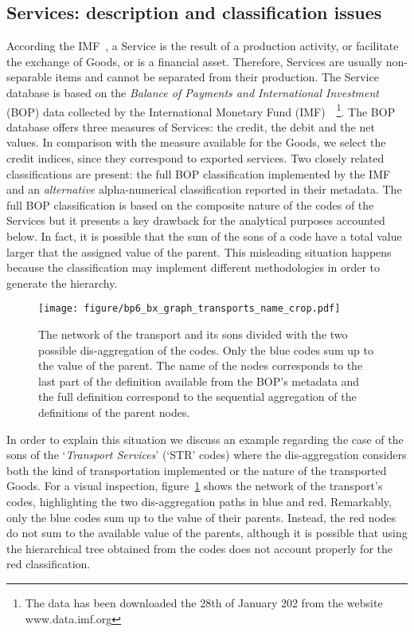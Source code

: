 \documentclass[fleqn,10pt]{article}
\begin{document}
\subsection*{Services: description and classification issues}
According the IMF~\cite{BOPS}, a Service is the result of a production activity, or facilitate the exchange of Goods, or is a financial asset.
Therefore, Services are usually non-separable items and cannot be separated from their production.
The Service database is based on the \textit{Balance of Payments and International Investment} (BOP) data collected by the International Monetary Fund (IMF)~\cite{BOPS}~\footnote{The data has been downloaded the 28th of January 202 from the website www.data.imf.org}.
The BOP database offers three measures of Services: the credit, the debit and the net values. In comparison with the measure available for the Goods, we select the credit indices, since they correspond to exported services. Two closely related classifications are present: the full BOP classification implemented by the IMF and an \emph{alternative} alpha-numerical classification reported in their metadata.
The full BOP classification is based on the composite nature of the codes of the Services but it presents a key drawback for the analytical purposes accounted below.
In fact, it is possible that the sum of the sons of a code have a total value larger that the assigned value of the parent.
This misleading situation happens because the classification may implement different methodologies in order to generate the hierarchy.


\begin{figure}[!t]
	\centering
	\texttt{[image: figure/bp6\_bx\_graph\_transports\_name\_crop.pdf]}
	\caption{The network of the transport and its sons divided with the two possible dis-aggregation of the codes. Only the blue codes sum up to the value of the parent. The name of the nodes corresponds to the last part of the definition available from the BOP's metadata and the full definition correspond to the sequential aggregation of the definitions of the parent nodes.}
	\label{fig:network_transport}
\end{figure}
In order to explain this situation we discuss an example regarding the case of the  sons of the `\emph{Transport Services}' (`STR' codes) where the dis-aggregation considers both the kind of transportation implemented or the nature of the transported Goods.
For a visual inspection, figure~\ref{fig:network_transport} shows the network of the transport's codes, highlighting the two dis-aggregation paths in blue and red.
Remarkably, only the blue codes sum up to the value of their parents.
Instead, the red nodes do not sum to the available value of the parents, although it is possible that using the hierarchical tree obtained from the codes does not account properly for the red classification.
\end{document}
